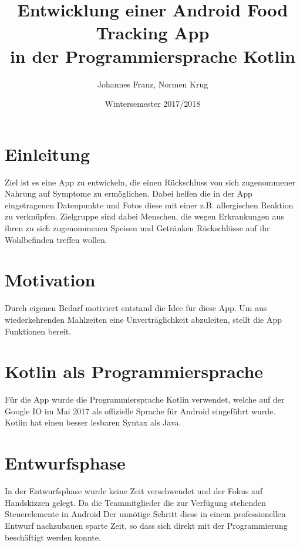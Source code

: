 \documentclass[
    DIV12,
    cleardouble=plain,
    headings=normal,
    pdftex,
    headexclude,footexclude,
    final
]{scrreprt}
\title{
  Entwicklung einer Android Food Tracking App \\[1em]
  in der Programmiersprache Kotlin  
}
\author{Johannes Franz, Normen Krug}
\date{Wintersemester 2017/2018}
\begin{document}
\maketitle



\tableofcontents


\newpage
{}


\chapter{Einleitung}
Ziel ist es eine App zu entwickeln, die einen Rückschluss von sich zugenommener Nahrung auf Symptome zu ermöglichen. Dabei helfen die in der App eingetragenen Datenpunkte und Fotos diese mit einer z.B. allergischen Reaktion zu verknüpfen.
Zielgruppe sind dabei Menschen, die wegen Erkrankungen aus ihren zu sich zugenommenen Speisen und Getränken Rückschlüsse auf ihr Wohlbefinden treffen wollen.


\newpage

\chapter{Motivation}
Durch eigenen Bedarf motiviert entstand die Idee für diese App. Um aus wiederkehrenden Mahlzeiten eine Unverträglichkeit abzuleiten, stellt die App Funktionen bereit.



\chapter{Kotlin als Programmiersprache}
Für die App wurde die Programmiersprache Kotlin verwendet, welche auf der Google IO im Mai 2017 als offizielle Sprache für Android eingeführt wurde. Kotlin hat einen besser lesbaren Syntax als Java. 


\newpage

\chapter{Entwurfsphase}
In der Entwurfsphase wurde keine Zeit verschwendet und der Fokus auf Handskizzen gelegt. Da die Teammitglieder die zur Verfügung stehenden Steuerelemente in Android  Der unnötige Schritt diese in einem professionellen Entwurf nachzubauen sparte Zeit, so dass sich direkt mit der Programmierung beschäftigt werden konnte.
\end{document}
